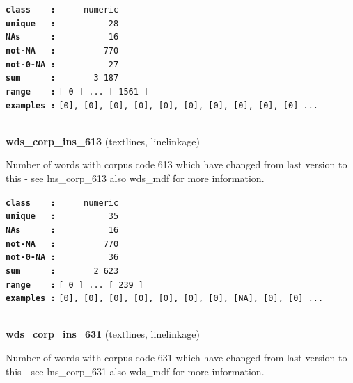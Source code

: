 \documentclass[]{article}
\begin{document}
\textbf{\texttt{class\ \ \ \ :}} \texttt{~~~~~numeric}\\
\textbf{\texttt{unique\ \ \ :}} \texttt{~~~~~~~~~~28}\\
\textbf{\texttt{NAs\ \ \ \ \ \ :}} \texttt{~~~~~~~~~~16}\\
\textbf{\texttt{not-NA\ \ \ :}} \texttt{~~~~~~~~~770}\\
\textbf{\texttt{not-0-NA\ :}} \texttt{~~~~~~~~~~27}\\
\textbf{\texttt{sum\ \ \ \ \ \ :}} \texttt{~~~~~~~3~187}\\
\textbf{\texttt{range\ \ \ \ :}}
\texttt{{[}\ 0\ {]}\ ...\ {[}\ 1561\ {]}}\\
\textbf{\texttt{examples\ :}}
\texttt{{[}0{]},\ {[}0{]},\ {[}0{]},\ {[}0{]},\ {[}0{]},\ {[}0{]},\ {[}0{]},\ {[}0{]},\ {[}0{]},\ {[}0{]}\ ...}\\

~

\textbf{wds\_corp\_ins\_613} (textlines, linelinkage)

Number of words with corpus code 613 which have changed from last
version to this - see lns\_corp\_613 also wds\_mdf for more information.

\textbf{\texttt{class\ \ \ \ :}} \texttt{~~~~~numeric}\\
\textbf{\texttt{unique\ \ \ :}} \texttt{~~~~~~~~~~35}\\
\textbf{\texttt{NAs\ \ \ \ \ \ :}} \texttt{~~~~~~~~~~16}\\
\textbf{\texttt{not-NA\ \ \ :}} \texttt{~~~~~~~~~770}\\
\textbf{\texttt{not-0-NA\ :}} \texttt{~~~~~~~~~~36}\\
\textbf{\texttt{sum\ \ \ \ \ \ :}} \texttt{~~~~~~~2~623}\\
\textbf{\texttt{range\ \ \ \ :}}
\texttt{{[}\ 0\ {]}\ ...\ {[}\ 239\ {]}}\\
\textbf{\texttt{examples\ :}}
\texttt{{[}0{]},\ {[}0{]},\ {[}0{]},\ {[}0{]},\ {[}0{]},\ {[}0{]},\ {[}0{]},\ {[}NA{]},\ {[}0{]},\ {[}0{]}\ ...}\\

~

\textbf{wds\_corp\_ins\_631} (textlines, linelinkage)

Number of words with corpus code 631 which have changed from last
version to this - see lns\_corp\_631 also wds\_mdf for more information.
\end{document}
